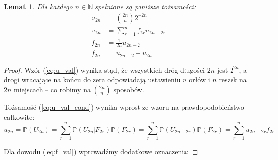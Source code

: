 \documentclass[a4paper,11pt,oneside]{book}
\newcommand{\Prob}{\mathbb{P}}
\newtheorem{lemat}[twier]{Lemat}
\theoremstyle{definition}
\begin{document}
\begin{lemat}
 \label{lem:uf_val}
 Dla każdego $n \in \mathbb{N}$ spełnione są poniższe tożsamości:
 \begin{align}
  u_{2n} &= \binom{2n}{n}2^{-2n}   \label{eq:u_val}\\
  u_{2n} &= \sum_{r=1}^n f_{2r} u_{2n-2r}   \label{eq:u_val_cond}\\
  f_{2n} &= \frac{1}{2n} u_{2n-2} \label{eq:f_val}\\
  f_{2n} &= u_{2n-2} - u_{2n} \label{eq:f_val2}
 \end{align}
\end{lemat}
\begin{proof}
 Wzór (\ref{eq:u_val}) wynika stąd, że wszystkich dróg długości $2n$ jest $2^{2n}$, a drogi wracające na końcu do zera odpowiadają ustawieniu $n$ orłów i $n$ reszek na $2n$ miejscach -- co robimy na $\binom{2n}{n}$ sposobów.
 
 Tożsamość (\ref{eq:u_val_cond}) wynika wprost ze wzoru na prawdopodobieństwo całkowite:
 \[ u_{2n} = \Prob(U_{2n}) = \sum_{r=1}^n \Prob(U_{2n}|F_{2r}) \Prob(F_{2r}) = \sum_{r=1}^n \Prob(U_{2n-2r}) \Prob(F_{2r}) = \sum_{r=1}^n u_{2n-2r}f_{2r}  \]
 
 Dla dowodu (\ref{eq:f_val}) wprowadźmy dodatkowe oznaczenia:
 

\end{proof}
\end{document}
